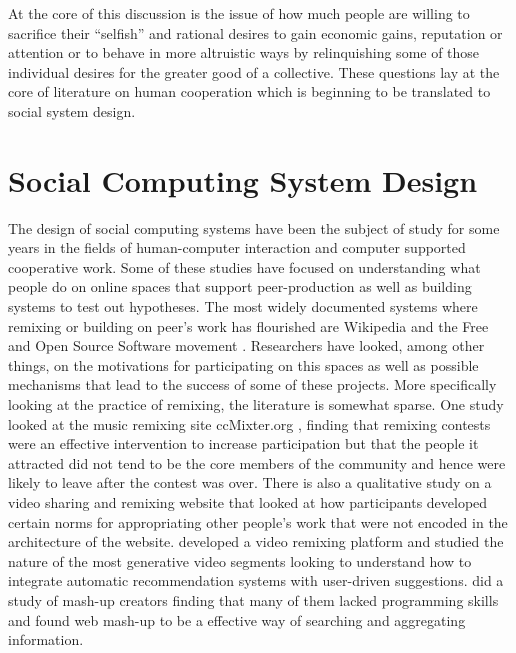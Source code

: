 At the core of this discussion is the issue of how much people are willing to sacrifice their ``selfish'' and rational desires to gain economic gains, reputation or attention or to behave in more altruistic ways by relinquishing some of those individual desires for the greater good of a collective. 
These questions lay at the core of literature on human cooperation which is beginning to be translated to social system design.

\section{Social Computing System Design}
The design of social computing systems have been the subject of study for some years in the fields of human-computer interaction and computer supported cooperative work. Some of these studies have focused on understanding what people do on online spaces that support peer-production as well as building systems to test out hypotheses. 
The most widely documented systems where remixing or building on peer's work has flourished are Wikipedia and the Free and Open Source Software movement \citep{raymond, benkler, viegas, newbook, kittur}. 
Researchers have looked, among other things, on the motivations for participating on this spaces as well as possible mechanisms that lead to the success of some of these projects.
More specifically looking at the practice of remixing, the literature is somewhat sparse. 
One study looked at the music remixing site ccMixter.org \citep{cheliotis_analysis_2009}, finding that remixing contests were an effective intervention to increase participation but that the people it attracted did not tend to be the core members of the community and hence were likely to leave after the contest was over.
There is also a qualitative study on a video sharing and remixing website \citet{diakopoulos_evolution_2007} that looked at how participants developed certain norms for appropriating other people's work that were not encoded in the architecture of the website.
\citet{shaw_community_2006} developed a video remixing platform and studied the nature of the most generative video segments looking to understand how to integrate automatic recommendation systems with user-driven suggestions.
\citet{zang_mashup} did a study of mash-up creators finding that many of them lacked programming skills and found web mash-up to be a effective way of searching and aggregating information.
